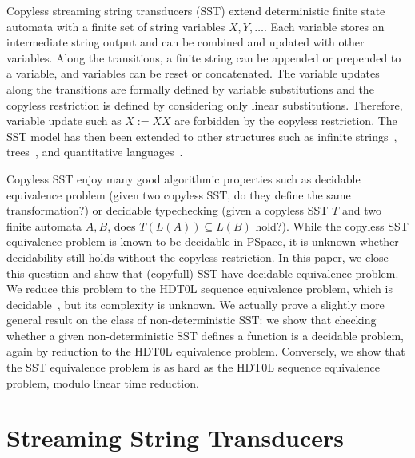 \documentclass{llncs}
\begin{document}
Copyless streaming string transducers (SST) extend deterministic finite state
automata with a finite set of string variables $X,Y,\dots$. Each variable stores an
intermediate string output and can be combined and updated with other 
variables. Along the transitions, a finite string can be appended or
prepended to a variable, and variables can be reset or
concatenated. The variable updates along the transitions are formally
defined by variable substitutions and the copyless restriction
is defined by considering only linear substitutions. Therefore,
variable update such as $X := XX$ are forbidden by the copyless
restriction. The SST model has then been extended to other structures
such as infinite strings~\cite{DBLP:conf/lics/AlurFT12}, 
trees~\cite{DBLP:conf/icalp/AlurD12}, and quantitative
languages~\cite{DBLP:conf/lics/AlurDDRY13}.


Copyless SST enjoy many good algorithmic properties such as decidable
equivalence problem (given two copyless SST, do they define the same 
transformation?) or decidable typechecking (given a copyless SST $T$
and two finite automata $A,B$, does $T(L(A))\subseteq L(B)$
hold?). While the copyless SST equivalence problem is known to be
decidable in \textsf{PSpace}, it is unknown whether decidability still
holds without the copyless restriction. In this paper, we close this
question and show that (copyfull) SST have decidable equivalence
problem. We reduce this problem to the HDT0L sequence equivalence
problem, which is decidable~\cite{DBLP:journals/tcs/CulikK86}, but its complexity is
unknown. We actually prove a slightly more general result on the class
of non-deterministic SST: we show that checking whether a
given non-deterministic SST defines a function is a decidable problem, again by
reduction to the HDT0L equivalence problem. Conversely, we show that the SST equivalence problem is as
hard as the HDT0L sequence equivalence problem, modulo linear time
reduction.



\section{Streaming String Transducers}
\end{document}
